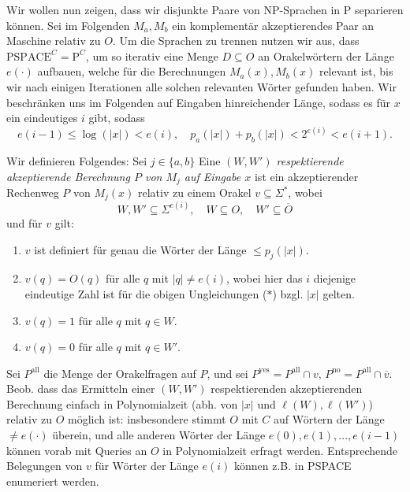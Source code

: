 \documentclass[nofonts]{uebung}
\def\P{\ensuremath{\mathrm{P}}}
\begin{document}
Wir wollen nun zeigen, dass wir disjunkte Paare von NP-Sprachen in P separieren können. Sei im Folgenden $M_a, M_b$ ein komplementär akzeptierendes Paar an Maschine relativ zu $O$. Um die Sprachen zu trennen nutzen wir aus, dass $\mathrm{PSPACE}^C=\P^C$, um so iterativ eine Menge $D\subseteq O$ an Orakelwörtern der Länge $e(\cdot)$ aufbauen, welche für die Berechnungen $M_a(x), M_b(x)$ relevant ist, bis wir nach einigen Iterationen alle solchen relevanten Wörter gefunden haben. 
Wir beschränken uns im Folgenden auf Eingaben hinreichender Länge, sodass es für $x$ ein eindeutiges $i$ gibt, sodass
\[ e(i-1) \leq \log(|x|) < e(i), \quad p_a(|x|)+p_b(|x|)< 2^{e(i)} < e(i+1).\tag{\ast} \]

Wir definieren Folgendes: %
Sei $j\in \{a,b\}$
Eine \emph{$(W, W')$ respektierende akzeptierende Berechnung $P$ von $M_j$ auf Eingabe $x$} ist ein akzeptierender Rechenweg $P$ von $M_j(x)$ relativ zu einem Orakel $v\subseteq\Sigma^*$, wobei 
\[ W,W'\subseteq \Sigma^{e(i)}, \quad W\subseteq O, \quad W'\subseteq\overline{O} \]
und für $v$ gilt:
\begin{enumerate}[noitemsep,label=\arabic*.]
    \item $v$ ist definiert für genau die Wörter der Länge $\leq p_j(|x|)$.
    \item $v(q)=O(q)$ für alle $q$ mit $|q|\neq  e(i)$, wobei hier das $i$ diejenige eindeutige Zahl ist für die obigen Ungleichungen ($\ast$) bzgl. $|x|$ gelten.
    \item $v(q)=1$ für alle $q$ mit $q\in W$.
    \item $v(q)=0$ für alle $q$ mit $q\in W'$.
\end{enumerate}

Sei $P^\mathrm{all}$ die Menge der Orakelfragen auf $P$, und sei $P^\mathrm{yes}=P^\mathrm{all}\cap v$, $P^\mathrm{no}=P^\mathrm{all}\cap \overline{v}$.
Beob. dass  das Ermitteln einer $(W, W')$ respektierenden akzeptierenden Berechnung einfach in Polynomialzeit (abh. von $|x|$ und $\ell(W),\ell(W')$) relativ zu $O$ möglich ist: insbesondere stimmt $O$ mit $C$ auf Wörtern der Länge $\neq e(\cdot)$ überein, und alle anderen Wörter der Länge $e(0), e(1), \dots, e(i-1)$ können vorab mit Queries an $O$ in Polynomialzeit erfragt werden.
Entsprechende Belegungen von $v$ für Wörter der Länge $e(i)$ können z.B. in PSPACE enumeriert werden.
\end{document}
